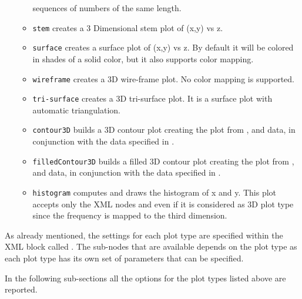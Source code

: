 \begin{itemize}
\begin{itemize}
    sequences of numbers of the same length.
    \item \texttt{stem} creates a 3 Dimensional stem plot of (x,y) vs z.
    \item \texttt{surface} creates a surface plot of (x,y) vs z.
    By default it will be colored in shades of a solid color, but it also
    supports color mapping.
    \item \texttt{wireframe} creates a 3D wire-frame plot.
    No color mapping is supported.
    \item \texttt{tri-surface} creates a 3D tri-surface plot.
    It is a surface plot with automatic triangulation.
    \item \texttt{contour3D} builds a 3D contour plot creating the plot from
    ,  and  data, in conjunction with the data
    specified in .
    \item \texttt{filledContour3D} builds a filled 3D contour plot creating the
    plot from ,  and  data, in conjunction with
    the data specified in .
    \item \texttt{histogram} computes and draws the histogram of x and y.
    \nb This plot accepts only the XML nodes  and  even if
    it is considered as 3D plot type since the frequency is mapped to the third
    dimension.
  \end{itemize}
\end{itemize}

As already mentioned, the settings for each plot type are specified within the
XML block called .
%
The sub-nodes that are available depends on the plot type as each plot type has
its own set of parameters that can be specified.

In the following sub-sections all the options for the plot types listed above
are reported.

